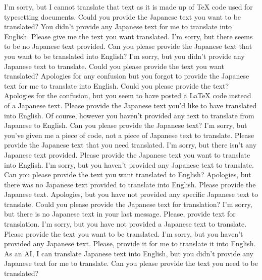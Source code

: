 {%
I'm sorry, but I cannot translate that text as it is made up of TeX code used for typesetting documents. Could you provide the Japanese text you want to be translated?
You didn't provide any Japanese text for me to translate into English. Please give me the text you want translated.
I'm sorry, but there seems to be no Japanese text provided. Can you please provide the Japanese text that you want to be translated into English?
I'm sorry, but you didn't provide any Japanese text to translate. Could you please provide the text you want translated?
Apologies for any confusion but you forgot to provide the Japanese text for me to translate into English. Could you please provide the text?
Apologies for the confusion, but you seem to have posted a LaTeX code instead of a Japanese text. Please provide the Japanese text you'd like to have translated into English.
Of course, however you haven't provided any text to translate from Japanese to English. Can you please provide the Japanese text?
I'm sorry, but you've given me a piece of code, not a piece of Japanese text to translate. Please provide the Japanese text that you need translated.
I'm sorry, but there isn't any Japanese text provided. Please provide the Japanese text you want to translate into English.
I'm sorry, but you haven't provided any Japanese text to translate. Can you please provide the text you want translated to English?
Apologies, but there was no Japanese text provided to translate into English. Please provide the Japanese text.
Apologies, but you have not provided any specific Japanese text to translate. Could you please provide the Japanese text for translation?
I'm sorry, but there is no Japanese text in your last message. Please, provide text for translation.
I'm sorry, but you have not provided a Japanese text to translate. Please provide the text you want to be translated.
I'm sorry, but you haven't provided any Japanese text. Please, provide it for me to translate it into English.
As an AI, I can translate Japanese text into English, but you didn't provide any Japanese text for me to translate. Can you please provide the text you need to be translated?
}
